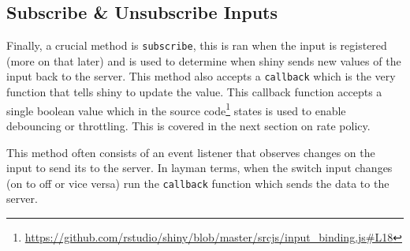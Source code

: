 \documentclass[
]{krantz}
\renewcommand{\href}[2]{#2\footnote{\url{#1}}}
\begin{document}
\hypertarget{shiny-input-sub-unsub}{%
\subsection{Subscribe \& Unsubscribe Inputs}\label{shiny-input-sub-unsub}}

Finally, a crucial method is \texttt{subscribe}, this is ran when the input is registered (more on that later) and is used to determine when shiny sends new values of the input back to the server. This method also accepts a \texttt{callback} which is the very function that tells shiny to update the value. This callback function accepts a single boolean value which in the \href{https://github.com/rstudio/shiny/blob/master/srcjs/input_binding.js\#L18}{source code} states is used to enable debouncing or throttling. This is covered in the next section on rate policy.

This method often consists of an event listener that observes changes on the input to send its to the server. In layman terms, when the switch input changes (on to off or vice versa) run the \texttt{callback} function which sends the data to the server.
\end{document}
